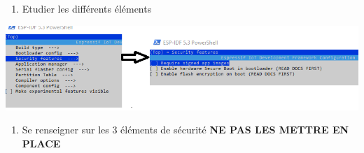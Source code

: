 \documentclass[french, 12pt]{article}%
\newcommand{\itemE}{\item[$\bullet$]}
\newif\ifPROF
\begin{document}
\begin{enumerate}[resume]
\item Etudier les différents éléments
\end{enumerate}

\begin{center}
\includegraphics[scale=0.7]{./ressource/menuconfig}
\end{center}

\begin{enumerate}[resume]
\item Se renseigner sur les 3 éléments de sécurité \textbf{NE PAS LES METTRE EN PLACE}
\end{enumerate}




\ifPROF
\color{red}
\begin{itemize}
\itemE Require signed app images : Permet d'exécuter uniquement les images d'application signées avec une clé privée approuvée, empêchant les firmwares non autorisés. La signature est vérifiée au démarrage à l'aide d'une clé publique incluse dans le chargeur d'amorçage.

\itemE Enable hardware secure biit in booloader : Vérifie l'intégrité du chargeur d'amorçage lors de chaque démarrage grâce à une clé unique stockée dans les e-fuses. Garantit que le chargeur d'amorçage n'a pas été modifié, protégeant contre les attaques de remplacement.
\itemE Enable flash encryption on boot : Chiffre automatiquement le contenu de la mémoire flash pour empêcher l'accès non autorisé aux données sensibles. La clé de chiffrement est unique et stockée de manière sécurisée dans le matériel de l'ESP32.
\end{itemize}

\normalcolor
\fi
\end{document}
